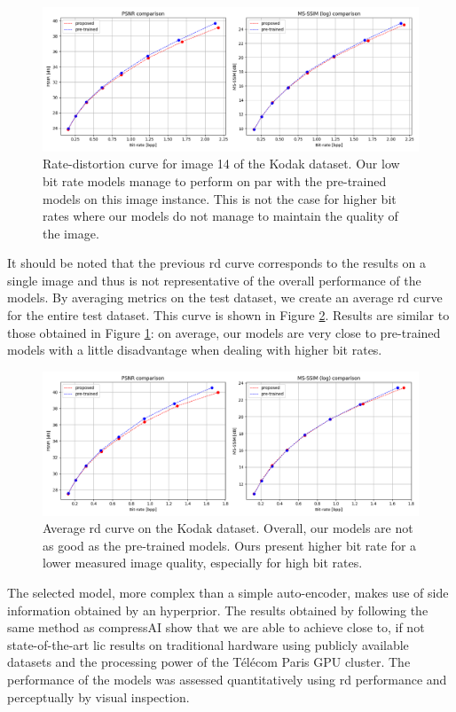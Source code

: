 \begin{figure}
    \centering
    \includegraphics[width=15cm]{img/bdpsnr_rd_kodak_14.png}
    \caption[Rate-distortion curve for image 14 of the Kodak dataset.]{Rate-distortion curve for image 14 of the Kodak dataset. Our low bit rate models manage to perform on par with the pre-trained models on this image instance. This is not the case for higher bit rates where our models do not manage to maintain the quality of the image.}
    \label{bdpsnr_2}
\end{figure}

It should be noted that the previous \acrshort{rd} curve corresponds to the results on a single image and thus is not representative of the overall performance of the models. By averaging metrics on the test dataset, we create an average \acrshort{rd} curve for the entire test dataset. This curve is shown in Figure \ref{bdpsnr_3}. Results are similar to those obtained in Figure \ref{bdpsnr_2}: on average, our models are very close to pre-trained models with a little disadvantage when dealing with higher bit rates.

\begin{figure}
    \centering
    \includegraphics[width=15cm]{img/bdpsnr_rd.png}
    \caption[Average \acrlong{rd} curve on the Kodak dataset.]{Average \acrlong{rd} curve on the Kodak dataset. Overall, our models are not as good as the pre-trained models. Ours present higher bit rate for a lower measured image quality, especially for high bit rates.}
    \label{bdpsnr_3}
\end{figure}

The selected model, more complex than a simple auto-encoder, makes use of side information obtained by an hyperprior. The results obtained by following the same method as compressAI show that we are able to achieve close to, if not state-of-the-art \acrshort{lic} results on traditional hardware using publicly available datasets and the processing power of the Télécom Paris GPU cluster. The performance of the models was assessed quantitatively using \acrshort{rd} performance and perceptually by visual inspection.